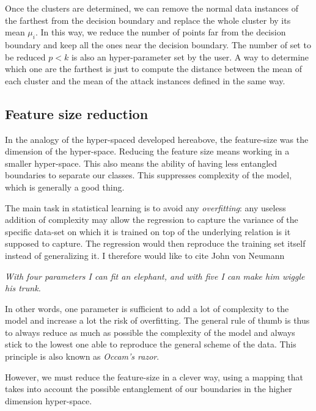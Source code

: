 Once the clusters are determined, we can remove the normal data instances of the farthest from the decision boundary and replace the whole cluster by its mean $\mu_i$. In this way, we reduce the number of points far from the decision boundary and keep all the ones near the decision boundary. The number of set to be reduced $p<k$ is also an hyper-parameter set by the user. A way to determine which one are the farthest is just to compute the distance between the mean of each cluster and the mean of the attack instances defined in the same way.

\subsection{Feature size reduction}
In the analogy of the hyper-spaced developed hereabove, the feature-size was the dimension of the hyper-space. Reducing the feature size means working in a smaller hyper-space. This also means the ability of having less entangled boundaries to separate our classes. This suppresses complexity of the model, which is generally a good thing.

The main task in statistical learning is to avoid any \emph{overfitting}: any useless addition of complexity may allow the regression to capture the variance of the specific data-set on which it is trained on top of the underlying relation is it supposed to capture. The regression would then reproduce the training set itself instead of generalizing it. I therefore would like to cite John von Neumann
\begin{displayquote}
\emph{With four parameters I can fit an elephant, and with five I can make him wiggle his trunk.}
\end{displayquote}

In other words, one parameter is sufficient to add a lot of complexity to the model and increase a lot the risk of overfitting. The general rule of thumb is thus to always reduce as much as possible the complexity of the model and always stick to the lowest one able to reproduce the general scheme of the data. This principle is also known as \emph{Occam's razor}.

However, we must reduce the feature-size in a clever way, using a mapping that takes into account the possible entanglement of our boundaries in the higher dimension hyper-space.

